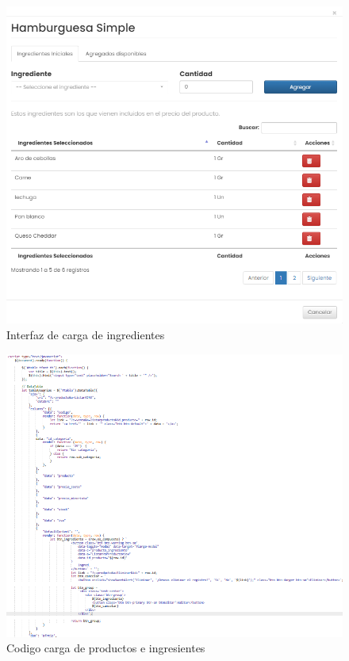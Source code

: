   \begin{figure}[H]
    \begin{center}
      \includegraphics[scale=0.50]{./sistema/ingrediente_de_producto.png}
      \caption{Interfaz de carga de ingredientes}
      \label{fig:product}
    \end{center}
  \end{figure}

  \begin{figure}[H]
    \begin{center}
      \includegraphics[scale=0.90]{./sistema/producto_codigo.png}
      \caption{Codigo carga de productos e ingresientes}
      \label{fig:product}
    \end{center}
  \end{figure}

